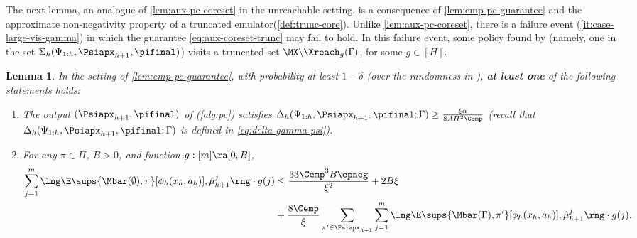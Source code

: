 \documentclass[11pt, oneside]{article}
\theoremstyle{plain}
\newtheorem{lemma}[theorem]{Lemma}
\theoremstyle{definition}
\numberwithin{theorem}{section}
\newcommand{\trunccore}{truncated emulator\xspace}
\renewcommand{\^}[1]{^{(#1)}}
\begin{document}
The next lemma, an analogue of \cref{lem:aux-pc-coreset} in the unreachable setting, is a consequence of \cref{lem:emp-pc-guarantee} and the approximate non-negativity property of a \trunccore (\cref{def:trunc-core}). Unlike \cref{lem:aux-pc-coreset}, there is a failure event (\cref{it:case-large-vis-gamma}) in which the guarantee \cref{eq:aux-coreset-trunc} may fail to hold. In this failure event, some policy found by \PC (namely, one in the set $\Sigma_h(\Psi_{1:h}, \Psiapx_{h+1}, \pifinal)$) visits a truncated set $\MX \backslash \Xreach_g(\Gamma)$, for some $g \in [H]$. 
\begin{lemma}
  \label{lem:newgamma-or-psigood}
  In the setting of \cref{lem:emp-pc-guarantee}, with probability at least $1-\delta$ (over the randomness in \PC), \textbf{at least one} of the following statements holds:
  \begin{enumerate}[label=(\alph*)]
  \item\label{it:case-large-vis-gamma} The output $(\Psiapx_{h+1}, \pifinal)$ of \PC (\cref{alg:pc}) satisfies $\Delta_h(\Psi_{1:h},\Psiapx_{h+1},\pifinal;\Gamma) \geq \frac{\xi \alpha}{8AH^2 \Cemp}$ (recall that $\Delta_h(\Psi_{1:h},\Psiapx_{h+1},\pifinal;\Gamma)$ is defined in \cref{eq:delta-gamma-psi}).
  \item\label{it:case-small-vis-gamma} For any $\pi \in \Pi$, $B > 0$, and function $g : [m] \ra [0,B]$,
    \begin{align}
      \sum_{j=1}^m \lng \E\sups{\Mbar(\emptyset), \pi}[\phi_h(x_h, a_h)], \hat \mu_{h+1}^j \rng \cdot g(j) 
      &\leq  \frac{33 \Cemp^3 B \epneg}{\xi^2} + 2B\xi \nonumber\\
      & + \frac{8 \Cemp}{\xi} \sum_{\pi' \in \Psiapx_{h+1}} \sum_{j=1}^m \lng \E\sups{\Mbar(\Gamma), \pi'}[\phi_h(x_h, a_h)], \hat \mu_{h+1}^j \rng \cdot g(j)\label{eq:aux-coreset-trunc}.
    \end{align}
  \end{enumerate}
\end{lemma}
\end{document}
